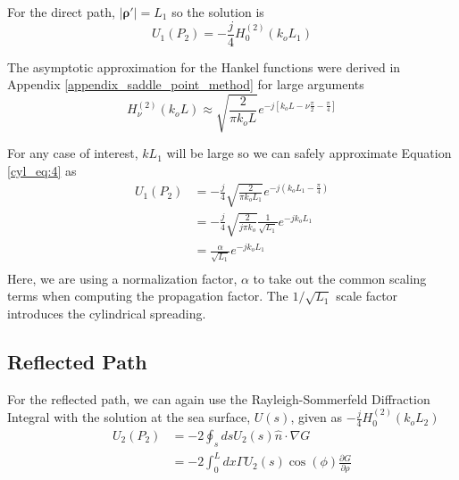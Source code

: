 For the direct path, $|\boldsymbol{\rho}'| = L_1$ so the  solution is
\begin{equation}
U_1(P_2) =-\frac{j}{4}H_0^{(2)}\left(k_oL_1 \right)
\label{cyl_eq:3}
\end{equation}
\renewcommand{\baselinestretch}{2} \small\normalsize

The asymptotic approximation for the Hankel functions were derived in Appendix \ref{appendix_saddle_point_method} for large arguments
\begin{equation}
H_{\nu}^{(2)}(k_oL) \approx \sqrt{\frac{2}{\pi k_o L}}e^{-j\left[k_oL - \nu\frac{\pi}{2} - \frac{\pi}{4}\right]}
\label{cyl_eq:4}
\end{equation}
\renewcommand{\baselinestretch}{2} \small\normalsize

For any case of interest, $kL_1$ will be large so we can safely approximate Equation \ref{cyl_eq:4} as
\begin{equation}
\begin{aligned}
U_1(P_2) &=-\frac{j}{4}\sqrt{\frac{2}{\pi k_o L_1}}e^{-j(k_oL_1 - \frac{\pi}{4})}\\
&=-\frac{j}{4}\sqrt{\frac{2}{j\pi k_o}}\frac{1}{\sqrt{L_1}}e^{-jk_oL_1 }\\
&=\frac{\alpha}{\sqrt{L_1}}e^{-jk_oL_1 }\\
\label{cyl_eq:5}
\end{aligned}
\end{equation}
\renewcommand{\baselinestretch}{2} \small\normalsize
Here, we are using a normalization factor, $\alpha$ to take out the common scaling terms when computing the propagation factor. The $1/\sqrt{L_1}$ scale factor introduces the cylindrical spreading.

\subsection{Reflected Path}
For the reflected path, we can again use the Rayleigh-Sommerfeld Diffraction Integral with the solution at the sea surface, $U(s)$, given as $-\frac{j}{4}H_0^{(2)}\left(k_oL_2 \right)$
\begin{equation}
\begin{aligned}
U_2(P_2) &= -2\oint_s ds U_2(s)\hat{n}\cdot\nabla G\\
&= -2\int_0^L dx \Gamma U_2(s)\cos(\phi)\frac{\partial G}{\partial \rho}\\
\end{aligned}
\label{cyl_eq:6}
\end{equation}

